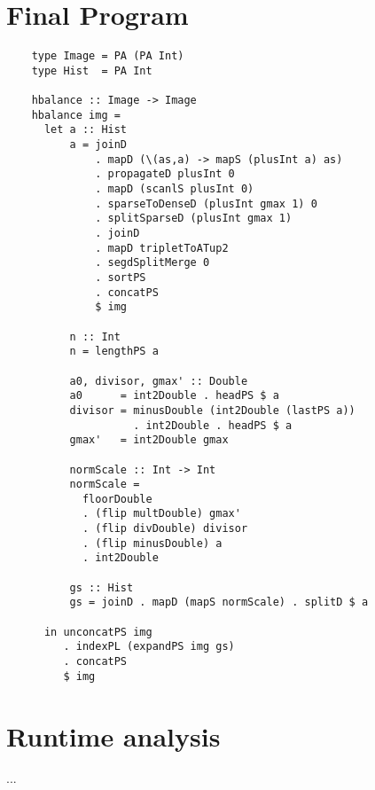   \section{Final Program}
    \begin{lstlisting}
    type Image = PA (PA Int)
    type Hist  = PA Int

    hbalance :: Image -> Image
    hbalance img =
      let a :: Hist
          a = joinD
              . mapD (\(as,a) -> mapS (plusInt a) as)
              . propagateD plusInt 0
              . mapD (scanlS plusInt 0)
              . sparseToDenseD (plusInt gmax 1) 0
              . splitSparseD (plusInt gmax 1)
              . joinD
              . mapD tripletToATup2
              . segdSplitMerge 0
              . sortPS
              . concatPS
              $ img
                  
          n :: Int
          n = lengthPS a
          
          a0, divisor, gmax' :: Double
          a0      = int2Double . headPS $ a
          divisor = minusDouble (int2Double (lastPS a))
                    . int2Double . headPS $ a
          gmax'   = int2Double gmax
          
          normScale :: Int -> Int
          normScale = 
            floorDouble
            . (flip multDouble) gmax'
            . (flip divDouble) divisor
            . (flip minusDouble) a
            . int2Double
            
          gs :: Hist
          gs = joinD . mapD (mapS normScale) . splitD $ a
          
      in unconcatPS img
         . indexPL (expandPS img gs)
         . concatPS
         $ img
    \end{lstlisting}
    
  \section{Runtime analysis}
    ...
    
    
